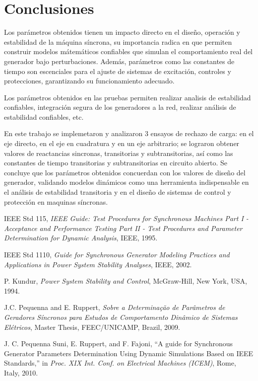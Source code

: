 \documentclass[conference]{IEEEtran}
\begin{document}
\section{Conclusiones}

Los parámetros obtenidos tienen un impacto directo en el diseño, operación y estabilidad de la máquina síncrona, su importancia radica en que permiten construir modelos mátemáticos confiables que simulan el comportamiento real del generador bajo perturbaciones. Además, parámetros como las constantes de tiempo son escenciales para el ajuste de sistemas de excitación, controles y protecciones, garantizando su funcionamiento adecuado.

Los parámetros obtenidos en las pruebas permiten realizar analisis de estabilidad confiables, integración segura de los generadores a la red, realizar análisis de estabilidad confiables, etc.

En este trabajo se implemetaron y analizaron 3 ensayos de rechazo de carga: en el eje directo, en el eje en cuadratura y en un eje arbitrario;
se lograron obtener valores de reactancias sincronas, transitorias y subtransitorias, así como las constantes de tiempo transitorias y subtransitorias en circuito abierto. Se concluye que los parámetros obtenidos concuerdan con los valores de diseño del generador, validando modelos dinámicos como una herramienta indispensable en el análisis
 de estabilidad transitoria y en el diseño de sistemas de control y protección en maquinas síncronas.
\begin{thebibliography}{plain}

IEEE Std 115, \emph{IEEE Guide: Test Procedures for Synchronous Machines Part I - Acceptance and Performance Testing Part II - Test Procedures and Parameter Determination for Dynamic Analysis}, IEEE, 1995.

IEEE Std 1110, \emph{Guide for Synchronous Generator Modeling Practices and Applications in Power System Stability Analyses}, IEEE, 2002.

P. Kundur, \emph{Power System Stability and Control}, McGraw-Hill, New York, USA, 1994.

J.C. Pequenna and E. Ruppert, \emph{Sobre a Determina\c{c}\~ao de Par\^ametros de Geradores S\'incronos para Estudos de Comportamento Din\^amico de Sistemas El\'etricos}, Master Thesis, FEEC/UNICAMP, Brazil, 2009.

J. C. Pequenna Suni, E. Ruppert, and F. Fajoni, ``A guide for Synchronous Generator Parameters Determination Using Dynamic Simulations Based on IEEE Standards,'' in \emph{Proc. XIX Int. Conf. on Electrical Machines (ICEM)}, Rome, Italy, 2010.

\end{thebibliography}
\end{document}
